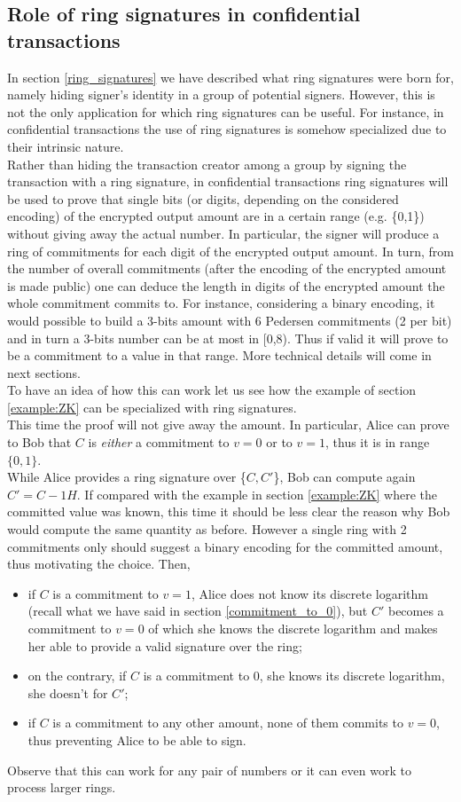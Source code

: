 \subsection{Role of ring signatures in confidential transactions}
\label{role_ring_sign_in_CT}
In section \ref{ring_signatures} we have described what ring signatures were born for, namely hiding signer's identity in a group of potential signers. However, this is not the only application for which ring signatures can be useful. For instance, in confidential transactions the use of ring signatures is somehow specialized due to their intrinsic nature.\\
Rather than hiding the transaction creator among a group by signing the transaction with a ring signature, in confidential transactions ring signatures will be used to prove that single bits (or digits, depending on the considered encoding) of the encrypted output amount are in a certain range (e.g. \{0,1\}) without giving away the actual number. In particular, the signer will produce a ring of commitments for each digit of the encrypted output amount. In turn, from the number of overall commitments (after the encoding of the encrypted amount is made public) one can deduce the length in digits of the encrypted amount the whole commitment commits to. For instance, considering a binary encoding, it would possible to build a 3-bits amount with 6 Pedersen commitments (2 per bit) and in turn a 3-bits number can be at most in [0,8). Thus if valid it will prove to be a commitment to a value in that range. More technical details will come in next sections.\\
To have an idea of how this can work let us see how the example of section \ref{example:ZK} can be specialized with ring signatures.\\
This time the proof will not give away the amount. In particular, Alice can prove to Bob that $C$ is \textit{either} a commitment to $v=0$ or to $v=1$, thus it is in range $\{0,1\}$.\\
While Alice provides a ring signature over \{$C, C'$\}, Bob can compute again $C' = C - 1H$. If compared with the example in section \ref{example:ZK} where the committed value was known, this time it should be less clear the reason why Bob would compute the same quantity as before. However a single ring with 2 commitments only should suggest a binary encoding for the committed amount, thus motivating the choice. Then,
\begin{itemize}
    \item if $C$ is a commitment to $v=1$, Alice does not know its discrete logarithm (recall what we have said in section \ref{commitment_to_0}), but $C'$ becomes a commitment to $v=0$ of which she knows the discrete logarithm and makes her able to provide a valid signature over the ring;
    \item on the contrary, if $C$ is a commitment to 0, she knows its discrete logarithm, she doesn’t for $C'$;
    \item if $C$ is a commitment to any other amount, none of them commits to $v=0$, thus preventing Alice to be able to sign.
\end{itemize}
Observe that this can work for any pair of numbers or it can even work to process larger rings.

